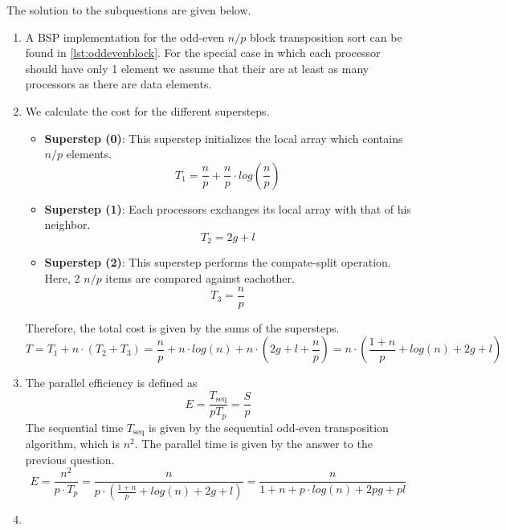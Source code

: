 \documentclass[../main.tex]{subfiles}
\begin{document}
\begin{solution} The solution to the subquestions are given below.
\begin{enumerate}
	\item A BSP implementation for the odd-even $n/p$ block transposition sort can be found in \autoref{lst:oddevenblock}. For the special case in which each processor should have only 1 element we assume that their are at least as many processors as there are data elements.
		
	\item We calculate the cost for the different supersteps.
	\begin{itemize}
		\item \textbf{Superstep (0)}: This superstep initializes the local array which contains $n/p$ elements.
		\begin{equation}
			T_1 = \frac{n}{p} + \frac{n}{p} \cdot log(\frac{n}{p})
		\end{equation}
		\item \textbf{Superstep (1)}: Each processors exchanges its local array with that of his neighbor.
		\begin{equation}
			T_2 = 2 g + l
		\end{equation}
		\item \textbf{Superstep (2)}: This superstep performs the compate-split operation. Here, 2 $n/p$ items are compared against eachother.
		\begin{equation}
			T_3 = \frac{n}{p}
		\end{equation}
	\end{itemize}
	Therefore, the total cost is given by the sums of the supersteps.
	\begin{equation}
		T = T_1 + n \cdot (T_2 + T_3) = \frac{n}{p} + n \cdot log(n) + n \cdot (2 g + l + \frac{n}{p}) = n \cdot \left( \frac{1+n}{p} + log(n) + 2g + l \right)
	\end{equation}
	\item The parallel efficiency is defined as
	\begin{equation}
		E = \frac{T_\text{seq}}{p T_p} = \frac{S}{p}
	\end{equation}
	The sequential time $T_\text{seq}$ is given by the sequential odd-even transposition algorithm, which is $n^2$. The parallel time is given by the answer to the previous question.
	\begin{equation}
		E = \frac{n^2}{p \cdot T_p} = \frac{n}{p \cdot \left( \frac{1+n}{p} + log(n) + 2g + l \right)} = \frac{n}{ 1 + n + p \cdot log(n) + 2pg + pl}
	\end{equation}
	\item
\end{enumerate}
\end{solution}
\end{document}
